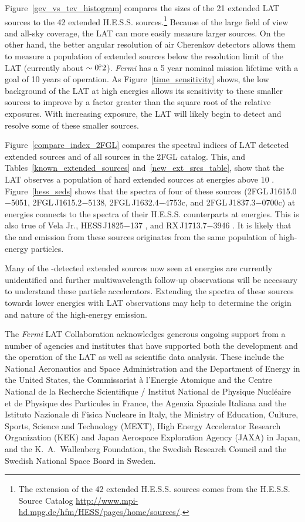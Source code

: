 \documentclass[12pt,preprint]{aastex}
\newcommand{\gev}{\text{GeV}\xspace}
\newcommand{\tev}{\text{TeV}\xspace}
\newcommand{\fermi}{\textit{Fermi}\xspace}
\begin{document}
Figure~\ref{gev_vs_tev_histogram} compares the sizes of the 21 extended
LAT sources to the 42 extended H.E.S.S. sources.\footnote{The 
\tev extension of
the 42 extended H.E.S.S. sources comes from the H.E.S.S. Source
Catalog \url{http://www.mpi-hd.mpg.de/hfm/HESS/pages/home/sources/}.}
Because of the large
field of view and all-sky coverage, the LAT can more easily measure
larger sources.  On the other hand, the 
better
angular resolution of air Cherenkov detectors allows them to measure a
population of extended sources below the resolution limit of the LAT (currently 
about $\sim0\mbox{$.\!\!^\circ$}2$).  \fermi has a 5 year nominal mission lifetime with
a goal of 10 years of operation.  As Figure~\ref{time_sensitivity} shows,
the low background of the LAT at high energies allows its sensitivity 
to
these smaller sources to improve by a factor greater than the square root
of the relative exposures.  With increasing exposure, the LAT will likely begin to
detect and resolve some of these smaller \tev sources.

Figure~\ref{compare_index_2FGL} compares the spectral indices of LAT
detected extended sources and of all sources in the 2FGL catalog. This, and
Tables~\ref{known_extended_sources} and~\ref{new_ext_srcs_table},
show that the LAT observes a population of hard extended sources
at energies above 10 \gev.  Figure~\ref{hess_seds} shows that
the spectra of four of these sources (2FGL\,J1615.0$-$5051,
2FGL\,J1615.2$-$5138, 2FGL\,J1632.4$-$4753c, and 2FGL\,J1837.3$-$0700c)
at \gev energies connects to the spectra of their H.E.S.S. counterparts
at \tev energies. This is also true of Vela Jr., HESS\,J1825$-$137
\citep{fermi_hess_j1825}, and RX\,J1713.7$-$3946 \citep{rx_j1713_lat}.
It is likely that the \gev and \tev emission from these sources originates
from the same population of high-energy particles.

Many of the \tev-detected extended sources now seen at \gev energies
are currently unidentified and further multiwavelength follow-up
observations will be necessary to understand these particle accelerators.
Extending the spectra of these \tev sources towards lower energies
with LAT observations may help to determine the origin and nature of
the high-energy emission.



The \textit{Fermi} LAT Collaboration acknowledges generous ongoing support
from a number of agencies and institutes that have supported both the
development and the operation of the LAT as well as scientific data analysis.
These include the National Aeronautics and Space Administration and the
Department of Energy in the United States, the Commissariat \`a l'Energie Atomique
and the Centre National de la Recherche Scientifique / Institut National de Physique
Nucl\'eaire et de Physique des Particules in France, the Agenzia Spaziale Italiana
and the Istituto Nazionale di Fisica Nucleare in Italy, the Ministry of Education,
Culture, Sports, Science and Technology (MEXT), High Energy Accelerator Research
Organization (KEK) and Japan Aerospace Exploration Agency (JAXA) in Japan, and
the K.~A.~Wallenberg Foundation, the Swedish Research Council and the
Swedish National Space Board in Sweden.
\end{document}
